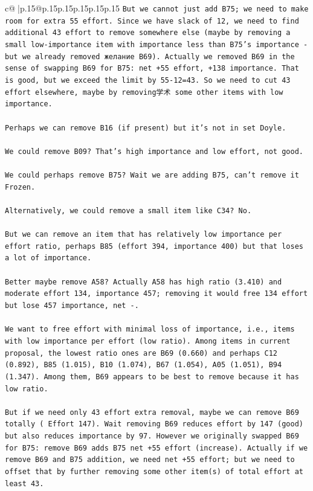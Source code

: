 \documentclass{article}
\begin{document}
{\begin{supertabular}{c@{$\;$}|p{.15\linewidth}@{}p{.15\linewidth}p{.15\linewidth}p{.15\linewidth}p{.15\linewidth}p{.15\linewidth}}
{{{\texttt{But we cannot just add B75; we need to make room for extra 55 effort. Since we have slack of 12, we need to find additional 43 effort to remove somewhere else (maybe by removing a small low{-}importance item with importance less than B75's importance {-} but we already removed желание B69). Actually we removed B69 in the sense of swapping B69 for B75: net +55 effort, +138 importance. That is good, but we exceed the limit by 55{-}12=43. So we need to cut 43 effort elsewhere, maybe by removing学术 some other items with low importance.} \\
\\ 
\texttt{Perhaps we can remove B16 (if present) but it's not in set Doyle.} \\
\\ 
\texttt{We could remove B09? That's high importance and low effort, not good.} \\
\\ 
\texttt{We could perhaps remove B75? Wait we are adding B75, can't remove it Frozen.} \\
\\ 
\texttt{Alternatively, we could remove a small item like C34? No.} \\
\\ 
\texttt{But we can remove an item that has relatively low importance per effort ratio, perhaps B85 (effort 394, importance 400) but that loses a lot of importance.} \\
\\ 
\texttt{Better maybe remove A58? Actually A58 has high ratio (3.410) and moderate effort 134, importance 457; removing it would free 134 effort but lose 457 importance, net {-}.} \\
\\ 
\texttt{We want to free effort with minimal loss of importance, i.e., items with low importance per effort (low ratio). Among items in current proposal, the lowest ratio ones are B69 (0.660) and perhaps C12 (0.892), B85 (1.015), B10 (1.074), B67 (1.054), A05 (1.051), B94 (1.347). Among them, B69 appears to be best to remove because it has low ratio.} \\
\\ 
\texttt{But if we need only 43 effort extra removal, maybe we can remove B69 totally ( Effort 147). Wait removing B69 reduces effort by 147 (good) but also reduces importance by 97. However we originally swapped B69 for B75: remove B69 adds B75 net +55 effort (increase). Actually if we remove B69 and B75 addition, we need net +55 effort; but we need to offset that by further removing some other item(s) of total effort at least 43.} \\
}}}
\end{supertabular}}
\end{document}
